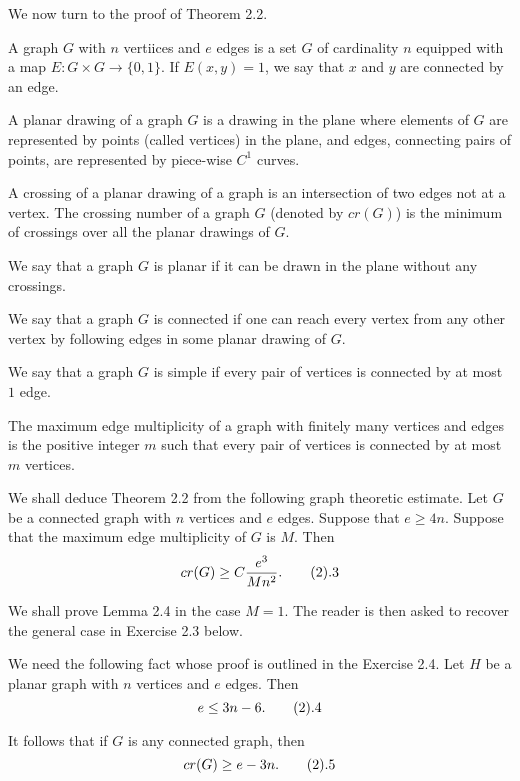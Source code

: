 We now turn to the proof of Theorem 2.2.

 A graph $G$ with $n$ vertiices and $e$ edges
is a set $G$ of cardinality $n$ equipped with a map $E: G \times G
\to \{0,1\}$. If $E(x,y)=1$, we say that $x$ and $y$ are connected
by an edge. \enddefinition

 A planar drawing of a graph $G$ is a drawing
in the plane where elements of $G$ are represented by points
(called vertices) in the plane, and edges, connecting pairs of
points, are represented by piece-wise $C^1$ curves. \enddefinition

 A crossing of a planar drawing of a graph is
an intersection of two edges not at a vertex. The crossing number
of a graph $G$ (denoted by $cr(G)$) is the minimum of crossings
over all the planar drawings of $G$. \enddefinition

 We say that a graph $G$ is planar if it can
be drawn in the plane without any crossings. \enddefinition

 We say that a graph $G$ is connected if one
can reach every vertex from any other vertex by following edges in
some planar drawing of $G$. \enddefinition

 We say that a graph $G$ is simple if
every pair of vertices is connected by at most $1$ edge.
\enddefinition

 The maximum edge multiplicity of a graph
with finitely many vertices and edges is the positive integer $m$
such that every pair of vertices is connected by at most $m$
vertices. \enddefinition

We shall deduce Theorem 2.2 from the following graph theoretic
estimate.  Let $G$ be a connected graph with
$n$ vertices and $e$ edges. Suppose that $e \ge 4n$. Suppose that
the maximum edge multiplicity of $G$ is $M$. Then
$$ cr(G) \ge C\frac{e^3}{Mn^2}. \tag2.3$$ \endproclaim

We shall prove Lemma 2.4 in the case $M=1$. The reader is then
asked to recover the general case in Exercise 2.3 below.

We need the following fact whose proof is outlined in the Exercise
2.4. Let $H$ be a planar graph with $n$ vertices and $e$ edges.
Then
$$ e \leq 3n-6. \tag2.4$$

It follows that if $G$ is any connected graph, then
$$ cr(G) \ge e-3n. \tag2.5$$


